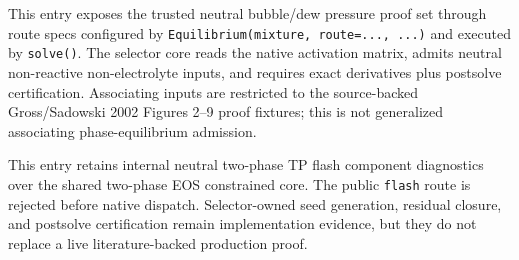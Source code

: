 \documentclass[12pt, letterpaper]{article}
\begin{document}
This entry exposes the trusted neutral bubble/dew pressure proof set through route specs
configured by \texttt{Equilibrium(mixture, route=..., ...)} and executed by
\texttt{solve()}. The selector core reads the
native activation matrix, admits neutral non-reactive non-electrolyte inputs,
and requires exact derivatives plus postsolve certification. Associating inputs
are restricted to the source-backed Gross/Sadowski 2002 Figures 2--9 proof
fixtures; this is not generalized associating phase-equilibrium admission.


This entry retains internal neutral two-phase TP flash component diagnostics
over the shared two-phase EOS constrained core. The public \texttt{flash}
route is rejected before native dispatch. Selector-owned seed generation,
residual closure, and postsolve certification remain implementation evidence,
but they do not replace a live literature-backed production proof.
\end{document}
